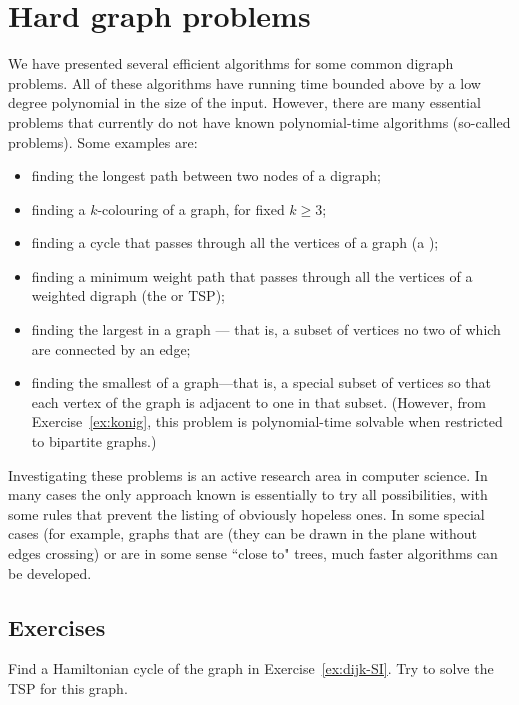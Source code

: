 \section{Hard graph problems}
\label{sec:hardgraph}
We have presented several efficient algorithms for some common digraph
problems. All of these algorithms have running time bounded above by a low
degree polynomial in the size of the input. However, there are many
essential problems that currently do not have known polynomial-time
algorithms (so-called  problems). Some examples
are:
\begin{itemize}
\item finding the longest path between two nodes of
a digraph;
\item finding a $k$-colouring of a graph, for fixed $k\geq
3$;
\item finding a cycle that passes through all the vertices of
a graph (a );
\item finding a
minimum weight path that passes through all the vertices of a weighted
digraph (the  or TSP);
\item finding the largest  in a graph --- that is, 
a subset of vertices no two of which are connected by an edge;
\item finding the smallest 
 of a graph---that is, a special subset of
vertices so that each vertex of the graph is adjacent to one in that
subset. (However, from Exercise~\ref{ex:konig}, this problem 
is polynomial-time solvable when restricted to bipartite graphs.)

\end{itemize}

Investigating these problems is an active research area in computer
science. In many cases the only approach known is essentially to try
all possibilities, with some rules that prevent the listing of obviously
hopeless ones. In some special cases (for example, graphs that are 
 (they can be drawn in the plane without edges crossing) 
or are in some sense ``close to" trees, much faster algorithms can be developed.

\subsection*{Exercises}

\begin{Exercise}\label{exr:tsp}
Find a Hamiltonian cycle of the graph in Exercise~\ref{ex:dijk-SI}. Try to solve
the TSP for this graph.
\end{Exercise}

